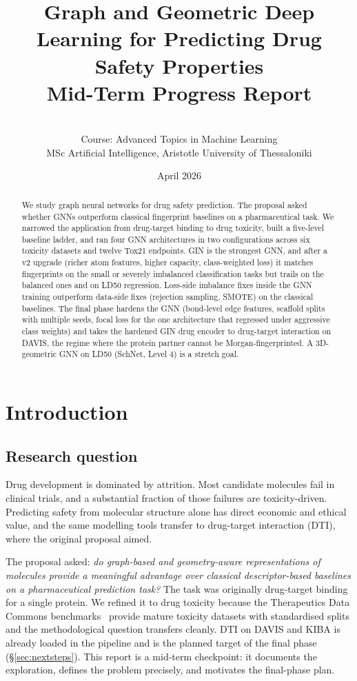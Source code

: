 \documentclass[a4paper,11pt]{article}
\title{Graph and Geometric Deep Learning for Predicting Drug Safety Properties\\[0.3em]
\large Mid-Term Progress Report}
\author{
\gr{Κωνσταντίνα Πάσχου} \and
\gr{Γεώργιος Κεσογλίδης} \and
\gr{Θεοχάρης Αγγελίδης}\\[0.4em]
\small Course: Advanced Topics in Machine Learning\\
\small MSc Artificial Intelligence, Aristotle University of Thessaloniki
}
\date{April 2026}
\begin{document}
\maketitle

\begin{abstract}
We study graph neural networks for drug safety prediction. The proposal asked whether GNNs outperform classical fingerprint baselines on a pharmaceutical task. We narrowed the application from drug-target binding to drug toxicity, built a five-level baseline ladder, and ran four GNN architectures in two configurations across six toxicity datasets and twelve Tox21 endpoints. GIN is the strongest GNN, and after a v2 upgrade (richer atom features, higher capacity, class-weighted loss) it matches fingerprints on the small or severely imbalanced classification tasks but trails on the balanced ones and on LD50 regression. Loss-side imbalance fixes inside the GNN training outperform data-side fixes (rejection sampling, SMOTE) on the classical baselines. The final phase hardens the GNN (bond-level edge features, scaffold splits with multiple seeds, focal loss for the one architecture that regressed under aggressive class weights) and takes the hardened GIN drug encoder to drug-target interaction on DAVIS, the regime where the protein partner cannot be Morgan-fingerprinted. A 3D-geometric GNN on LD50 (SchNet, Level 4) is a stretch goal.
\end{abstract}

\section{Introduction}

\subsection{Research question}

Drug development is dominated by attrition. Most candidate molecules fail in clinical trials, and a substantial fraction of those failures are toxicity-driven. Predicting safety from molecular structure alone has direct economic and ethical value, and the same modelling tools transfer to drug-target interaction (DTI), where the original proposal aimed.

The proposal asked: \emph{do graph-based and geometry-aware representations of molecules provide a meaningful advantage over classical descriptor-based baselines on a pharmaceutical prediction task?} The task was originally drug-target binding for a single protein. We refined it to drug toxicity because the Therapeutics Data Commons benchmarks~\cite{huang2021} provide mature toxicity datasets with standardised splits and the methodological question transfers cleanly. DTI on DAVIS and KIBA is already loaded in the pipeline and is the planned target of the final phase (\S\ref{sec:nextsteps}). This report is a mid-term checkpoint: it documents the exploration, defines the problem precisely, and motivates the final-phase plan.
\end{document}
